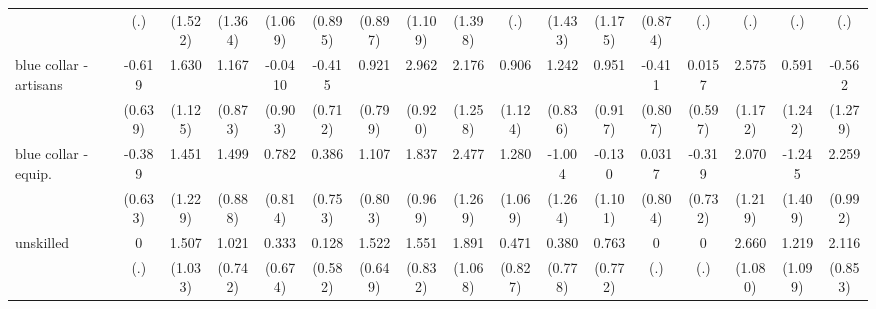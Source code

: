 {\begin{tabular}{l*{16}{c}}
                    &         (.)         &     (1.522)         &     (1.364)         &     (1.069)         &     (0.895)         &     (0.897)         &     (1.109)         &     (1.398)         &         (.)         &     (1.433)         &     (1.175)         &     (0.874)         &         (.)         &         (.)         &         (.)         &         (.)         \\
[1em]
blue collar - artisans&      -0.619         &       1.630         &       1.167         &     -0.0410         &      -0.415         &       0.921         &       2.962\sym{**} &       2.176         &       0.906         &       1.242         &       0.951         &      -0.411         &      0.0157         &       2.575\sym{*}  &       0.591         &      -0.562         \\
                    &     (0.639)         &     (1.125)         &     (0.873)         &     (0.903)         &     (0.712)         &     (0.799)         &     (0.920)         &     (1.258)         &     (1.124)         &     (0.836)         &     (0.917)         &     (0.807)         &     (0.597)         &     (1.172)         &     (1.242)         &     (1.279)         \\
[1em]
blue collar - equip.&      -0.389         &       1.451         &       1.499         &       0.782         &       0.386         &       1.107         &       1.837         &       2.477         &       1.280         &      -1.004         &      -0.130         &      0.0317         &      -0.319         &       2.070         &      -1.245         &       2.259\sym{*}  \\
                    &     (0.633)         &     (1.229)         &     (0.888)         &     (0.814)         &     (0.753)         &     (0.803)         &     (0.969)         &     (1.269)         &     (1.069)         &     (1.264)         &     (1.101)         &     (0.804)         &     (0.732)         &     (1.219)         &     (1.409)         &     (0.992)         \\
[1em]
unskilled           &           0         &       1.507         &       1.021         &       0.333         &       0.128         &       1.522\sym{*}  &       1.551         &       1.891         &       0.471         &       0.380         &       0.763         &           0         &           0         &       2.660\sym{*}  &       1.219         &       2.116\sym{*}  \\
                    &         (.)         &     (1.033)         &     (0.742)         &     (0.674)         &     (0.582)         &     (0.649)         &     (0.832)         &     (1.068)         &     (0.827)         &     (0.778)         &     (0.772)         &         (.)         &         (.)         &     (1.080)         &     (1.099)         &     (0.853)         \\

\end{tabular}}
